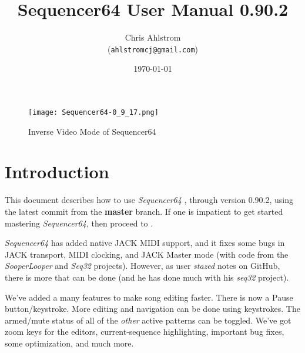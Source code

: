 \documentclass[
 11pt,
 twoside,
 a4paper,
 headinclude,
 footinclude,
 final                                 %
]{article}
\begin{document}
\title{Sequencer64 User Manual 0.90.2}
\author{Chris Ahlstrom \\
   (\texttt{ahlstromcj@gmail.com})}
\date{\today}
\maketitle

\begin{figure}[H]
   \centering 
   \texttt{[image: Sequencer64-0\_9\_17.png]}
   \caption*{Inverse Video Mode of Sequencer64}
\end{figure}

\clearpage                             %

\tableofcontents
\listoffigures                         %
\listoftables                          %


\setlength{\parindent}{0pt}
\setlength{\parskip}{1ex plus 0.5ex minus 0.2ex}

\section{Introduction}
\label{sec:introduction}

   This document describes how to use \textsl{Sequencer64}
   \cite{sequencer64}, through version 0.90.2,
   using the latest commit from the \textbf{master} branch.
   If one is impatient to get started mastering \textsl{Sequencer64},
   then proceed to .

   \textsl{Sequencer64} has added native JACK MIDI support,
   and it fixes some bugs in JACK transport, MIDI clocking, and
   JACK Master mode (with code from the \textsl{SooperLooper} 
   and \textsl{Seq32} projects).
   However, as user \textsl{stazed} notes on GitHub, there is more that can be
   done (and he has done much with his \textsl{seq32} \cite{seq32} project).

   We've added a many features to make song editing faster.
   There is now a Pause button/keystroke.
   More editing and navigation can be done using keystrokes.
   The armed/mute status of all of the \textsl{other} active patterns can be
   toggled.
   We've got zoom keys for the editors, current-sequence highlighting,
   important bug fixes, some optimization, and much more.
\end{document}
